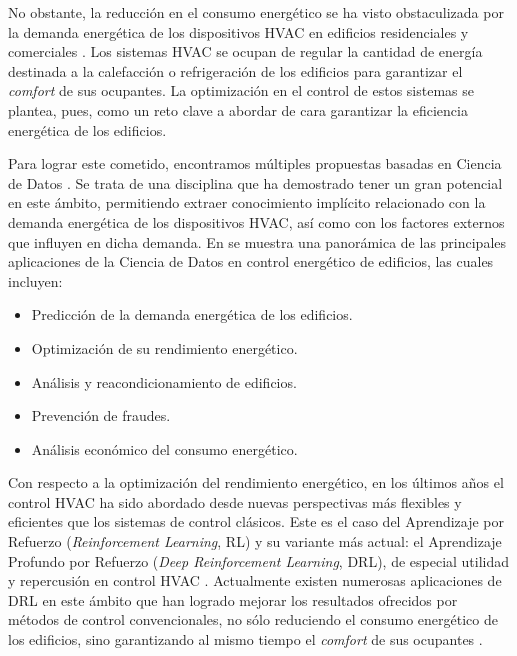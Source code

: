 No obstante, la reducción en el consumo energético se ha visto obstaculizada por la demanda energética de los dispositivos HVAC en edificios residenciales y comerciales \cite{garcia2012heat}. Los sistemas HVAC se ocupan de regular la cantidad de energía destinada a la calefacción o refrigeración de los edificios para garantizar el \textit{comfort} de sus ocupantes. La optimización en el control de estos sistemas se plantea, pues, como un reto clave a abordar de cara garantizar la eficiencia energética de los edificios.

Para lograr este cometido, encontramos múltiples propuestas basadas en Ciencia de Datos \cite{molina2017data}. Se trata de una disciplina que ha demostrado tener un gran potencial en este ámbito, permitiendo extraer conocimiento implícito relacionado con la demanda energética de los dispositivos HVAC, así como con los factores externos que influyen en dicha demanda. En \cite{molina2017data} se muestra una panorámica de las principales aplicaciones de la Ciencia de Datos en control energético de edificios, las cuales incluyen:

\begin{itemize}
    \item Predicción de la demanda energética de los edificios.
    \item Optimización de su rendimiento energético.
    \item Análisis y reacondicionamiento de edificios.
    \item Prevención de fraudes.
    \item Análisis económico del consumo energético.
\end{itemize}

Con respecto a la optimización del rendimiento energético, en los últimos años el control HVAC ha sido abordado desde nuevas perspectivas más flexibles y eficientes que los sistemas de control clásicos. Este es el caso del Aprendizaje por Refuerzo (\textit{Reinforcement Learning}, RL) y su variante más actual: el Aprendizaje Profundo por Refuerzo (\textit{Deep Reinforcement Learning}, DRL), de especial utilidad y repercusión en control HVAC \cite{vazquez2019reinforcement}. Actualmente existen numerosas aplicaciones de DRL en este ámbito que han logrado mejorar los resultados ofrecidos por métodos de control convencionales, no sólo reduciendo el consumo energético de los edificios, sino garantizando al mismo tiempo el \textit{comfort} de sus ocupantes \cite{du2021intelligent,mckee2020deep,zhang2018practical}.

